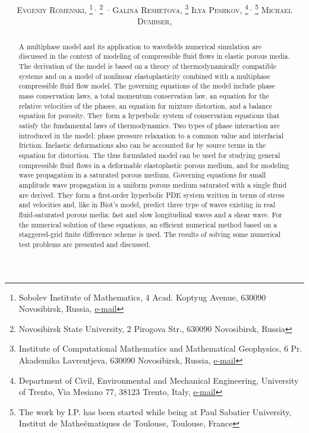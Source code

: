 \documentclass[3p,times,table]{article}
\title{\vspace{-15mm}\fontsize{14pt}{10pt}\bf\selectfont{
Modeling wavefields in saturated elastic porous media\\[1mm] based on 
thermodynamically 
compatible 
system theory for\\[1mm] multiphase mixtures}}
\author{\fontsize{10pt}{10pt}
	\textsc{Evgeniy Romenski},\hspace{-2mm}
	\thanks{Sobolev Institute of Mathematics, 4 Acad. Koptyug Avenue, 630090 
	Novosibirsk, 
	Russia, \href{mailto:evrom@math.nsc.ru}{e-mail}
		   }$\ ^, $
   \hspace{-3mm}
   \thanks{Novosibirsk State University, 2 Pirogova Str., 630090 Novosibirsk, Russia}
	\hspace{-1.5mm}$\ ^,$\samethanks[4]
\quad 
%
	\textsc{Galina Reshetova},\hspace{-2mm}
	\thanks{Institute of Computational Mathematics and Mathematical Geophysics, 6 Pr. 
	Akademika Lavrentjeva, 630090 Novosibirsk, Russia, 	\href{mailto:kgv@nmsf.sscc.ru}{e-mail}
		   }
\quad
	\textsc{Ilya Peshkov},\hspace{-2mm}
	\thanks{Department of Civil, Environmental and Mechanical Engineering, 
	University of Trento, Via Mesiano 77, 38123 Trento, Italy,
	\href{mailto:ilya.peshkov@unitn.it}{e-mail}
		   }$\ ^, $
	   \hspace{-2.5mm}
	   	\thanks{The work by I.P. has been started while being at Paul Sabatier 
	   	University, Institut de 
	   	Mathe\'ematiques 
	   	de Toulouse, Toulouse, France}
\quad
	\textsc{Michael Dumbser},\hspace{-2mm}
	\samethanks[4]
	   }
\begin{document}
 
\maketitle

\begin{abstract} 
\noindent
A multiphase model and its application to  wavefields numerical simulation 
are discussed in the context of modeling of compressible fluid flows in elastic 
porous media. The derivation of the model is based 
on  a theory of 
thermodynamically compatible systems and on  a model of nonlinear 
elastoplasticity combined with a multiphase compressible fluid flow model. The 
governing equations of the model include  phase mass conservation laws, a
total momentum conservation law, an equation for the relative velocities of the phases, an 
equation for mixture distortion, and a balance equation for 
porosity. They form a hyperbolic system of conservation equations that 
satisfy the fundamental laws of thermodynamics. Two types of phase interaction are 
introduced in the model: phase pressure relaxation to a common value and 
interfacial friction. Inelastic deformations also can be accounted for by  
source terms in the equation for distortion. The thus formulated model 
can be used for studying general compressible fluid flows in a deformable 
elastoplastic 
porous medium, and for modeling wave propagation in a saturated 
porous medium. 
Governing equations for small amplitude wave propagation in a uniform 
porous medium saturated 
with a single fluid are derived. They form a first-order hyperbolic PDE system 
written in 
terms of stress and velocities and, like in Biot's model, predict three type of 
waves existing in real fluid-saturated porous media: fast and 
slow longitudinal waves and a shear wave. For the 
numerical solution of these equations, an efficient numerical method based on a
staggered-grid finite 
difference scheme is used. The results of solving some numerical test problems are presented and discussed.

\end{abstract}

%
\end{document}
